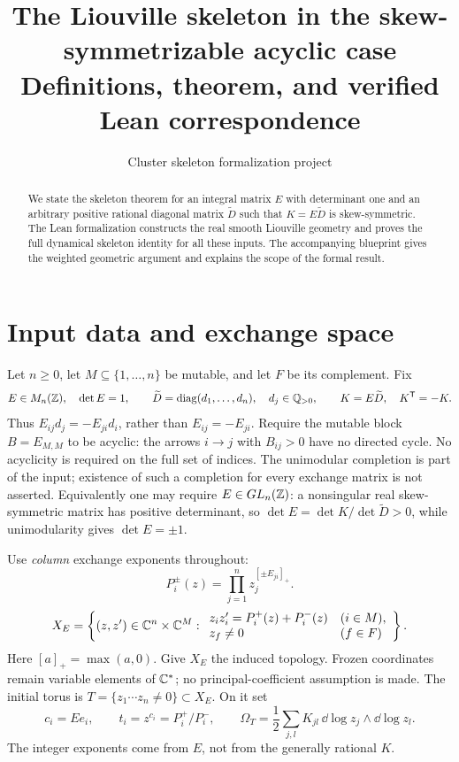 
\title{The Liouville skeleton in the skew-symmetrizable acyclic case\\[5pt]\large Definitions, theorem, and verified Lean correspondence}
\author{Cluster skeleton formalization project}
\date{}
\maketitle
\begin{abstract}
We state the skeleton theorem for an integral matrix $E$ with determinant
one and an arbitrary positive rational diagonal matrix $\widetilde D$ such
that $K=E\widetilde D$ is skew-symmetric. The Lean formalization constructs
the real smooth Liouville geometry and proves the full dynamical skeleton
identity for all these inputs. The accompanying blueprint gives the
weighted geometric argument and explains the scope of the formal result.
\end{abstract}

\section{Input data and exchange space}
Let $n\ge0$, let $M\subseteq\{1,\ldots,n\}$ be mutable, and let $F$ be
its complement. Fix
\[
 E\in M_n(\mathbb Z),\quad \det E=1,\qquad
 \widetilde D=\operatorname{diag}(d_1,\ldots,d_n),\quad
 d_j\in\mathbb Q_{>0},\qquad
 K=E\widetilde D,\quad K^{\mathsf T}=-K.
\]
Thus $E_{ij}d_j=-E_{ji}d_i$, rather than $E_{ij}=-E_{ji}$.
Require the mutable block $B=E_{M,M}$ to be acyclic: the arrows
$i\to j$ with $B_{ij}>0$ have no directed cycle. No acyclicity is
required on the full set of indices. The unimodular completion is part of
the input; existence of such a completion for every exchange matrix is
not asserted. Equivalently one may require $E\in GL_n(\mathbb Z)$: a nonsingular real skew-symmetric matrix
has positive determinant, so $\det E=\det K/\det\widetilde D>0$,
while unimodularity gives $\det E=\pm1$.

Use \emph{column} exchange exponents throughout:
\[
 P_i^\pm(z)=\prod_{j=1}^n z_j^{[\pm E_{ji}]_+}.
\]
\[
 X_E=\left\{(z,z')\in\mathbb C^n\times\mathbb C^M:
 \begin{array}{ll}
 z_i z_i'=P_i^+(z)+P_i^-(z)&(i\in M),\\
 z_f\ne0 &(f\in F)
 \end{array}\right\}.
\]
Here $[a]_+=\max(a,0)$. Give $X_E$ the induced topology. Frozen
coordinates remain variable elements of $\mathbb C^*$; no principal-coefficient
assumption is made. The initial torus is
$T=\{z_1\cdots z_n\ne0\}\subset X_E$. On it set
\[
 c_i=Ee_i,\qquad t_i=z^{c_i}=P_i^+/P_i^-,\qquad
 \Omega_T=\frac12\sum_{j,l}K_{jl}\,\dd\log z_j\wedge\dd\log z_l.
\]
The integer exponents come from $E$, not from the generally rational $K$.

